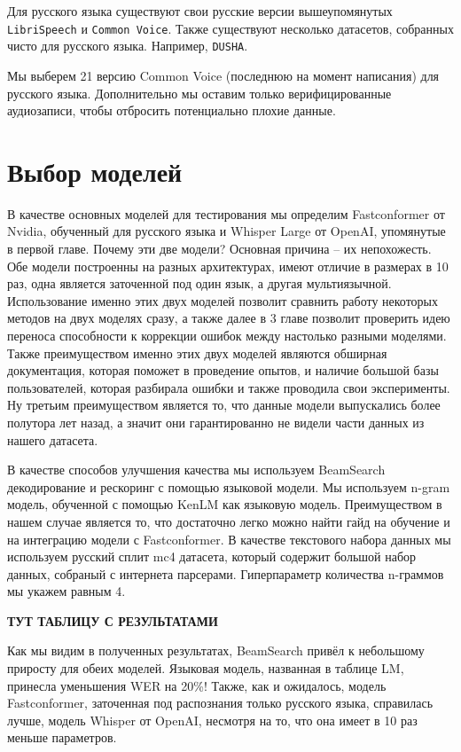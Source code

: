 Для русского языка существуют свои русские версии вышеупомянутых \texttt{LibriSpeech} и \texttt{Common Voice}.
Также существуют несколько датасетов, собранных чисто для русского языка. 
Например, \texttt{DUSHA}.

Мы выберем 21 версию Common Voice (последнюю на момент написания) для русского языка.
Дополнительно мы оставим только верифицированные аудиозаписи, чтобы отбросить потенциально плохие данные.

\section{Выбор моделей}
В качестве основных моделей для тестирования мы определим Fastconformer от Nvidia, обученный для русского языка и Whisper Large от OpenAI, упомянутые в первой главе.
Почему эти две модели? Основная причина – их непохожесть.
Обе модели построенны на разных архитектурах, имеют отличие в размерах в 10 раз, одна является заточенной под один язык, а другая мультиязычной.
Использование именно этих двух моделей позволит сравнить работу некоторых методов на двух моделях сразу, а также далее в 3 главе позволит проверить идею переноса способности к коррекции ошибок между настолько разными моделями.
Также преимуществом именно этих двух моделей являются обширная документация, которая поможет в проведение опытов, и наличие большой базы пользователей, которая разбирала ошибки и также проводила свои эксперименты.
Ну третьим преимуществом является то, что данные модели выпускались более полутора лет назад, а значит они гарантированно не видели части данных из нашего датасета.

В качестве способов улучшения качества мы используем BeamSearch декодирование и рескоринг с помощью языковой модели.
Мы используем n-gram модель, обученной с помощью KenLM как языковую модель.
Преимуществом в нашем случае является то, что достаточно легко можно найти гайд на обучение и на интеграцию модели с Fastconformer.
В качестве текстового набора данных мы используем русский сплит mc4 датасета, который содержит большой набор данных, собраный с интернета парсерами.
Гиперпараметр количества n-граммов мы укажем равным 4.

\textbf{ТУТ ТАБЛИЦУ С РЕЗУЛЬТАТАМИ}

Как мы видим в полученных результатах, BeamSearch привёл к небольшому приросту для обеих моделей.
Языковая модель, названная в таблице LM, принесла уменьшения WER на 20\%!
Также, как и ожидалось, модель Fastconformer, заточенная под распознания только русского языка, справилась лучше, модель Whisper от OpenAI, несмотря на то, что она имеет в 10 раз меньше параметров.

